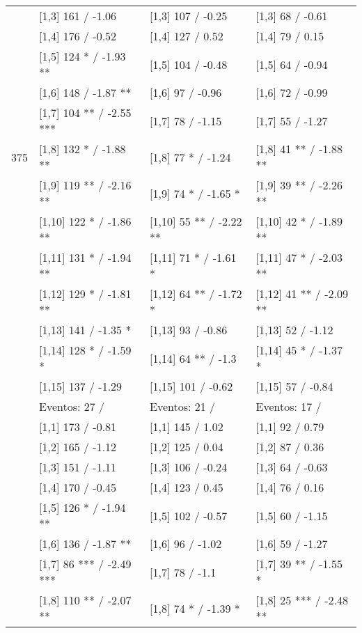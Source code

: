 \begin{table}
\begin{tabular}[t]{llll}
 & {}[1,3] 161  / -1.06 & {}[1,3] 107  / -0.25 & {}[1,3] 68  / -0.61\\
\addlinespace
 & {}[1,4] 176  / -0.52 & {}[1,4] 127  / 0.52 & {}[1,4] 79  / 0.15\\
 & {}[1,5] 124 * / -1.93 ** & {}[1,5] 104  / -0.48 & {}[1,5] 64  / -0.94\\
 & {}[1,6] 148  / -1.87 ** & {}[1,6] 97  / -0.96 & {}[1,6] 72  / -0.99\\
 & {}[1,7] 104 ** / -2.55 *** & {}[1,7] 78  / -1.15 & {}[1,7] 55  / -1.27\\
375 & {}[1,8] 132 * / -1.88 ** & {}[1,8] 77 * / -1.24 & {}[1,8] 41 ** / -1.88 **\\
\addlinespace
 & {}[1,9] 119 ** / -2.16 ** & {}[1,9] 74 * / -1.65 * & {}[1,9] 39 ** / -2.26 **\\
 & {}[1,10] 122 * / -1.86 ** & {}[1,10] 55 ** / -2.22 ** & {}[1,10] 42 * / -1.89 **\\
 & {}[1,11] 131 * / -1.94 ** & {}[1,11] 71 * / -1.61 * & {}[1,11] 47 * / -2.03 **\\
 & {}[1,12] 129 * / -1.81 ** & {}[1,12] 64 ** / -1.72 * & {}[1,12] 41 ** / -2.09 **\\
 & {}[1,13] 141  / -1.35 * & {}[1,13] 93  / -0.86 & {}[1,13] 52  / -1.12\\
\addlinespace
 & {}[1,14] 128 * / -1.59 * & {}[1,14] 64 ** / -1.3 & {}[1,14] 45 * / -1.37 *\\
 & {}[1,15] 137  / -1.29 & {}[1,15] 101  / -0.62 & {}[1,15] 57  / -0.84\\
 & Eventos:  27 / & Eventos:  21 / & Eventos:  17 /\\
 & {}[1,1] 173  / -0.81 & {}[1,1] 145  / 1.02 & {}[1,1] 92  / 0.79\\
 & {}[1,2] 165  / -1.12 & {}[1,2] 125  / 0.04 & {}[1,2] 87  / 0.36\\
\addlinespace
 & {}[1,3] 151  / -1.11 & {}[1,3] 106  / -0.24 & {}[1,3] 64  / -0.63\\
 & {}[1,4] 170  / -0.45 & {}[1,4] 123  / 0.45 & {}[1,4] 76  / 0.16\\
 & {}[1,5] 126 * / -1.94 ** & {}[1,5] 102  / -0.57 & {}[1,5] 60  / -1.15\\
 & {}[1,6] 136  / -1.87 ** & {}[1,6] 96  / -1.02 & {}[1,6] 59  / -1.27\\
 & {}[1,7] 86 *** / -2.49 *** & {}[1,7] 78  / -1.1 & {}[1,7] 39 ** / -1.55 *\\
\addlinespace
500 & {}[1,8] 110 ** / -2.07 ** & {}[1,8] 74 * / -1.39 * & {}[1,8] 25 *** / -2.48 **\\

\end{tabular}
\end{table}
